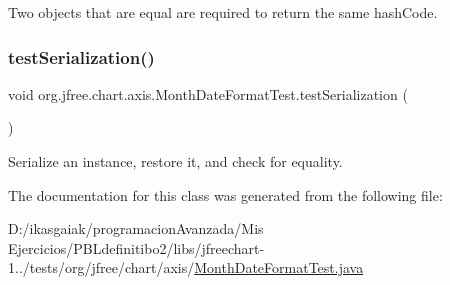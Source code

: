 Two objects that are equal are required to return the same hash\+Code. \mbox{\label{classorg_1_1jfree_1_1chart_1_1axis_1_1_month_date_format_test_a0d6cf28a2200d9ac0ca4cb1fdfc21abf}} 
\subsubsection{\texorpdfstring{test\+Serialization()}{testSerialization()}}
{\footnotesize\ttfamily void org.\+jfree.\+chart.\+axis.\+Month\+Date\+Format\+Test.\+test\+Serialization (\begin{DoxyParamCaption}{ }\end{DoxyParamCaption})}

Serialize an instance, restore it, and check for equality. 

The documentation for this class was generated from the following file\+:\begin{DoxyCompactItemize}
\item 
D\+:/ikasgaiak/programacion\+Avanzada/\+Mis Ejercicios/\+P\+B\+Ldefinitibo2/libs/jfreechart-\/1../tests/org/jfree/chart/axis/\mbox{\hyperlink{_month_date_format_test_8java}{Month\+Date\+Format\+Test.\+java}}\end{DoxyCompactItemize}
